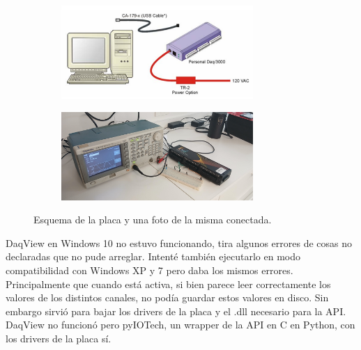 \begin{figure}[!ht]
	\begin{minipage}[c]{0.5\textwidth}
			\begin{subfigure}{\textwidth}
					\centering
					\includegraphics[width=0.8\textwidth]{"Figures/09_06_2025/Esquema placa"}
					\captionsetup{width=0.8\textwidth}
					\subcaption{}
				\end{subfigure}
		\end{minipage}\begin{minipage}[c]{0.49\textwidth}
			\begin{subfigure}{\textwidth}
					\centering
					\includegraphics[width=0.8\textwidth]{Figures/02_06_2025/Foto placa.jpg}
					\captionsetup{width=0.8\textwidth}
					\subcaption{}
				\end{subfigure}
		\end{minipage}
	\caption{Esquema de la placa y una foto de la misma conectada.}
	\label{fig:placa_esquema_y_foto}
\end{figure}



DaqView en Windows 10 no estuvo funcionando, tira algunos errores de cosas no declaradas que no pude arreglar. Intenté también ejecutarlo en modo compatibilidad con Windows XP y 7 pero daba los mismos errores. Principalmente que cuando está activa, si bien parece leer correctamente los valores de los distintos canales, no podía guardar estos valores en disco. Sin embargo sirvió para bajar los drivers de la placa y el .dll necesario para la API. 
DaqView no funcionó pero pyIOTech, un wrapper de la API en C en Python, con los drivers de la placa sí.

